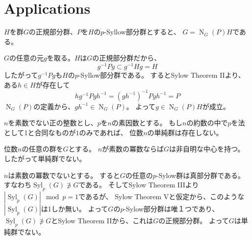 \documentclass[a4paper]{jarticle}
\newcommand{\Norm}{\operatorname{N}}
\newcommand{\Syl}{\operatorname{Syl}}
\begin{document}
    \section{Applications}
    \begin{Lemma}
        $H$を群$G$の正規部分群、$P$を$H$の$p$-Syllow部分群とすると、
        $G=\Norm_G(P)H$である。
    \end{Lemma}
    \begin{Proof}
        $G$の任意の元$g$を取る。$H$は$G$の正規部分群だから、
        \[ g^{-1}Pg \subset g^{-1}Hg=H \]
        したがって$g^{-1}Pg$も$H$の$p$-Syllow部分群である。
        するとSylow Theorem IIより、ある$h \in H$が存在して
        \[ hg^{-1} P gh^{-1} = (gh^{-1})^{-1} P gh^{-1} = P \]
        $\Norm_G(P)$の定義から、$gh^{-1} \in \Norm_G(P)$。
        よって$g \in \Norm_G(P)H$が成立。
        \QED
    \end{Proof}

    \begin{Prop}
        $n$を素数でない正の整数とし、$p$を$n$の素因数とする。
        もし$n$の約数の中で$p$を法として1と合同なものが$1$のみであれば、
        位数$n$の単純群は存在しない。
    \end{Prop}
    \begin{Proof}
        位数$n$の任意の群を$G$とする。
        $n$が素数の冪数ならば$G$は非自明な中心を持つ。したがって単純群でない。

        $n$は素数の冪数でないとする。
        すると$G$の任意の$p$-Sylow群は真部分群である。すなわち$\Syl_p(G) \not \ni G$である。
        そしてSylow Theorem IIIより$|\Syl_p(G)| \mod p=1$であるが、
        Sylow Theorem Vと仮定から、このような$|\Syl_p(G)|$は1しか無い。
        よって$G$の$p$-Sylow部分群は唯１つであり、
        $\Syl_p(G) \not \ni G$とSylow Theorem IIから、これは$G$の正規部分群。
        よって$G$は単純群でない。
    \end{Proof}
\end{document}
